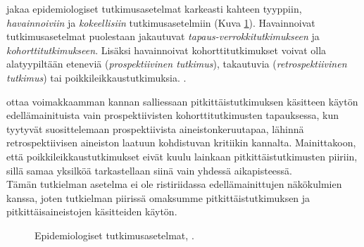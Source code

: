 \documentclass[finnish]{docopts}
\begin{document}
\cite{twisk13} jakaa epidemiologiset tutkimusasetelmat karkeasti kahteen tyyppiin, \textit{havainnoiviin} ja \textit{kokeellisiin} tutkimusasetelmiin (Kuva \ref{fig:epikaavio}). Havainnoivat tutkimusasetelmat puolestaan jakautuvat \textit{tapaus-verrokkitutkimukseen} ja \textit{kohorttitutkimukseen}. Lisäksi havainnoivat kohorttitutkimukset voivat olla alatyypiltään eteneviä (\textit{prospektiivinen tutkimus}), takautuvia (\textit{retrospektiivinen tutkimus}) tai poikkileikkaustutkimuksia. \cite{diggle13, twisk13}.

\cite{twisk13} ottaa voimakkaamman kannan salliessaan pitkittäistutkimuksen käsitteen käytön edellämainituista vain prospektiivisten kohorttitutkimusten tapauksessa, kun \cite{diggle13} tyytyvät suosittelemaan prospektiivista aineistonkeruutapaa, lähinnä retrospektiivisen aineiston laatuun kohdistuvan kritiikin kannalta. Mainittakoon, että poikkileikkaustutkimukset eivät kuulu lainkaan pitkittäistutkimusten piiriin, sillä samaa yksilköä tarkastellaan siinä vain yhdessä aikapisteessä.\\

Tämän tutkielman asetelma ei ole ristiriidassa edellämainittujen näkökulmien kanssa, joten tutkielman piirissä omaksumme pitkittäistutkimuksen ja pitkittäisaineistojen käsitteiden käytön. 

\begin{figure}
\centering
{}
\caption{Epidemiologiset tutkimusasetelmat, \cite{twisk13}.}
\label{fig:epikaavio}
\end{figure}
\end{document}
